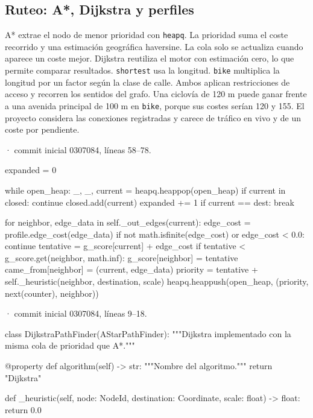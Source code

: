 \documentclass[11pt,a4paper]{article}
\begin{document}
\subsection{Ruteo: A*, Dijkstra y perfiles}
A* extrae el nodo de menor prioridad con \texttt{heapq}. La prioridad suma el coste recorrido y una estimación geográfica haversine. La cola solo se actualiza cuando aparece un coste mejor. Dijkstra reutiliza el motor con estimación cero, lo que permite comparar resultados. \texttt{shortest} usa la longitud. \texttt{bike} multiplica la longitud por un factor según la clase de calle. Ambos aplican restricciones de acceso y recorren los sentidos del grafo. Una ciclovía de 120 m puede ganar frente a una avenida principal de 100 m en \texttt{bike}, porque sus costes serían 120 y 155. El proyecto considera las conexiones registradas y carece de tráfico en vivo y de un coste por pendiente.

\smallskip
{\footnotesize\texttt{} · commit inicial 0307084, líneas 58--78.}\par
\begin{Codigo}[firstnumber=58]
        expanded = 0

        while open_heap:
            _, _, current = heapq.heappop(open_heap)
            if current in closed:
                continue
            closed.add(current)
            expanded += 1
            if current == dest:
                break

            for neighbor, edge_data in self._out_edges(current):
                edge_cost = profile.edge_cost(edge_data)
                if not math.isfinite(edge_cost) or edge_cost < 0.0:
                    continue
                tentative = g_score[current] + edge_cost
                if tentative < g_score.get(neighbor, math.inf):
                    g_score[neighbor] = tentative
                    came_from[neighbor] = (current, edge_data)
                    priority = tentative + self._heuristic(neighbor, destination, scale)
                    heapq.heappush(open_heap, (priority, next(counter), neighbor))
\end{Codigo}

\smallskip
{\footnotesize\texttt{} · commit inicial 0307084, líneas 9--18.}\par
\begin{Codigo}[firstnumber=9]
class DijkstraPathFinder(AStarPathFinder):
    """Dijkstra implementado con la misma cola de prioridad que A*."""

    @property
    def algorithm(self) -> str:
        """Nombre del algoritmo."""
        return "Dijkstra"

    def _heuristic(self, node: NodeId, destination: Coordinate, scale: float) -> float:
        return 0.0
\end{Codigo}
\end{document}
